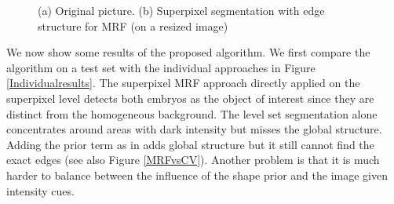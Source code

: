 \documentclass{article} %
\begin{document}
 \begin{figure}[htbp]
  \centering
\caption{(a) Original picture. (b) Superpixel segmentation with edge structure for MRF (on a resized image)}
\label{Superpixels}
 \end{figure}

We now show some results of the proposed algorithm. We first compare the algorithm on a test set with the individual approaches in Figure \eqref{Individualresults}. The superpixel MRF approach directly applied on the superpixel level detects both embryos as the object of interest since they are distinct from the homogeneous background. The level set segmentation alone concentrates around areas with dark intensity but misses the global structure. Adding the prior term as in \cite{Cremers06_KernelDensity} adds global structure but it still cannot find the exact edges (see also Figure \ref{MRFvsCV}). Another problem is that it is much harder to balance between the influence of the shape prior and the image given intensity cues. 
\end{document}
